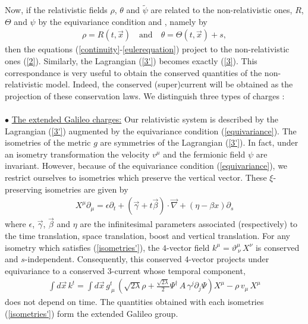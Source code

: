 \documentclass[11pt,a4paper]{article}
\begin{document}
Now, if the relativistic fields $\rho$, $\theta$ and $\tilde{\psi}$ are related to the non-relativistic ones, $R$, $\Theta$ and $\psi$ by the equivariance condition\cite{HH} and \cite{DBKP}, namely by
\begin{eqnarray}
\rho=R(t, \vec{x})\quad\mbox{and}\quad \theta=\Theta(t, \vec{x})+s,
\label{equivariance}
\end{eqnarray}
then the equations (\ref{continuity}-\ref{eulerequation}) project to the non-relativistic ones (\ref{2}). Similarly, the Lagrangian (\ref{3'}) becomes exactly (\ref{3}). This correspondance is very useful to obtain the conserved quantities of the non-relativistic model. Indeed, the conserved (super)current will be obtained as the projection of these conservation laws. We distinguish three types of charges :\\
\\
$\bullet$ \underline{The extended Galileo charges:} Our relativistic system is described by the Lagrangian (\ref{3'}) augmented by the equivariance condition (\ref{equivariance}). The isometries of the metric $g$ are symmetries of the Lagrangian (\ref{3'}). In fact, under an isometry transformation the velocity $v^\mu$ and the fermionic field $\psi$ are invariant. However, because of the equivariance condition (\ref{equivariance}), we restrict ourselves to isometries which preserve the vertical vector. These $\xi$-preserving isometries are given by
\begin{eqnarray}
X^\mu\partial_\mu=\epsilon\partial_t+(\vec{\gamma}+t\vec{\beta})\cdot\vec{\nabla}+(\eta-\beta 
x)\partial_s
\label{isometries'}
\end{eqnarray} 
where $\epsilon$, $\vec{\gamma}$, $\vec{\beta}$ and $\eta$ are the infinitesimal parameters associated (respectively) to the time translation, space translation, boost and vertical translation. For any isometry which satisfies (\ref{isometries'}), the $4$-vector field $k^\mu=\vartheta^{\mu}_{\ \nu}\,X^\nu$ is conserved and $s$-independent. Consequently, this conserved $4$-vector projects under equivariance to a conserved $3$-current whose temporal component,
\begin{eqnarray}
\int d\vec{x}\, k^t=\int d\vec{x}\,g^t_{\ \mu}\,\left(\sqrt{2\lambda}{\rho}+\frac{\sqrt{2\lambda}}{2}\Psi^\dagger\,A\,\gamma^j\partial_j\Psi\right)X^\mu-\rho\,v_\mu\,X^\mu
\label{galileo}
\end{eqnarray} 
does not depend on time. The quantities obtained with each isometries (\ref{isometries'}) form the extended Galileo group.\\
\end{document}
